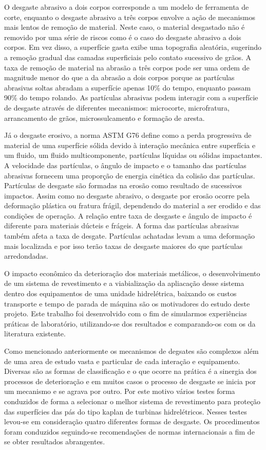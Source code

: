 O desgaste abrasivo a dois corpos corresponde a um modelo de ferramenta de
corte, enquanto o desgaste abrasivo a três corpos envolve a ação de mecanismos
mais lentos de remoção de material. Neste caso, o material desgastado não é
removido por uma série de riscos como é o caso do desgaste abrasivo a dois
corpos. Em vez disso, a superfície gasta exibe uma topografia aleatória,
sugerindo a remoção gradual das camadas superficiais pelo contato sucessivo de
grãos. A taxa de remoção de material na abrasão a três corpos pode ser uma
ordem de magnitude menor do que a da abrasão a dois corpos porque as partículas
abrasivas soltas abradam a superfície apenas 10\% do tempo, enquanto passam 90\%
do tempo rolando. As partículas abrasivas podem interagir com a superfície de
desgaste através de diferentes mecanismos: microcorte, microfratura,
arrancamento de grãos, microssulcamento e formação de aresta.

Já o desgaste erosivo, a norma ASTM G76 define como a perda progressiva de
material de uma superfície sólida devido à interação mecânica entre superfícia
e um fluido, um fluido multicomponente, partículas líquidas ou sólidas
impactantes. A velocidade das partículas, o ângulo de impacto e o tamanho das
partículas abrasivas fornecem uma proporção de energia cinética da colisão das
partículas. Partículas de desgaste são formadas na erosão como resultado de
sucessivos impactos. Assim como no desgaste abrasivo, o desgaste por erosão
ocorre pela deformação plástica ou fratura frágil, dependendo do material a ser
erodido e das condições de operação. A relação entre taxa de desgaste e ângulo
de impacto é diferente para materiais dúcteis e frágeis. A forma das partículas
abrasivas também afeta a taxa de desgate. Partículas achatadas levam a uma
deformação mais localizada e por isso terão taxas de desgaste maiores do que
partículas arredondadas.

O impacto econômico da deterioração dos materiais metálicos, o desenvolvimento
de um sistema de revestimento e a viabialização da apliacação desse sistema
dentro dos equipamentos de uma unidade hidrelétrica, baixando os custos 
transporte e tempo de parada de máquina são os motivadores do estudo deste
projeto. Este trabalho foi desenvolvido com o fim de simularmos  experiências
práticas de laboratório, utilizando-se dos resultados e comparando-os com os da
literatura existente.

Como mencionado anteriormente os mecanismos de degsates são complexos além de
uma area de estudo vasta e particular de cada interação e equipamento. Diversas
são as formas de classificação e o que ocorre na prática é a sinergia dos
processos de deterioração e em muitos casos o processo de desgaste se inicia
por um mecanismo e se agrava por outro. Por este motivo vários testes forma
conduzidos de forma a selecionar o melhor sistema de revestimento para proteção
das superfícies das pás do tipo kaplan de turbinas hidrelétricos. Nesses testes
levou-se em consideração quatro diferentes formas de desgaste. Os procedimentos
foram conduzidos seguindo-se recomendações de normas internacionais a fim de se
obter resultados abrangentes.

